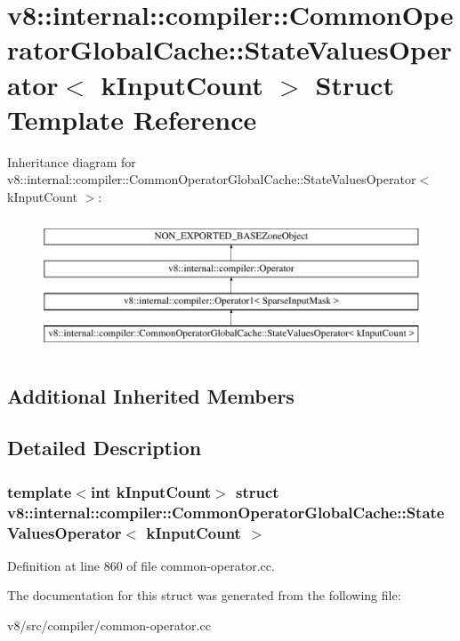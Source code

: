 \hypertarget{structv8_1_1internal_1_1compiler_1_1CommonOperatorGlobalCache_1_1StateValuesOperator}{}\section{v8\+:\+:internal\+:\+:compiler\+:\+:Common\+Operator\+Global\+Cache\+:\+:State\+Values\+Operator$<$ k\+Input\+Count $>$ Struct Template Reference}
\label{structv8_1_1internal_1_1compiler_1_1CommonOperatorGlobalCache_1_1StateValuesOperator}
Inheritance diagram for v8\+:\+:internal\+:\+:compiler\+:\+:Common\+Operator\+Global\+Cache\+:\+:State\+Values\+Operator$<$ k\+Input\+Count $>$\+:\begin{figure}[H]
\begin{center}
\leavevmode
\includegraphics[height=4.000000cm]{structv8_1_1internal_1_1compiler_1_1CommonOperatorGlobalCache_1_1StateValuesOperator}
\end{center}
\end{figure}
\subsection*{Additional Inherited Members}


\subsection{Detailed Description}
\subsubsection*{template$<$int k\+Input\+Count$>$\newline
struct v8\+::internal\+::compiler\+::\+Common\+Operator\+Global\+Cache\+::\+State\+Values\+Operator$<$ k\+Input\+Count $>$}



Definition at line 860 of file common-\/operator.\+cc.



The documentation for this struct was generated from the following file\+:\begin{DoxyCompactItemize}
\item 
v8/src/compiler/common-\/operator.\+cc\end{DoxyCompactItemize}
